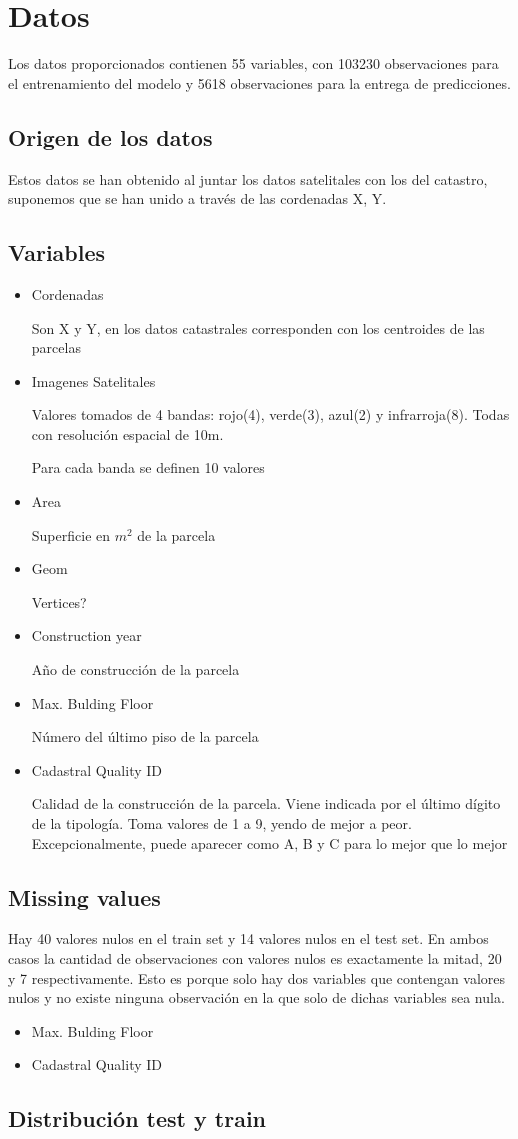 \section{Datos}
Los datos proporcionados contienen 55 variables, con 103230 observaciones para el entrenamiento del modelo y 5618 observaciones para la entrega de predicciones.
\par
\subsection{Origen de los datos}
Estos datos se han obtenido al juntar los datos satelitales con los del catastro, suponemos que se han unido a través de las cordenadas X, Y.
\subsection{Variables}
\begin{itemize}
\item Cordenadas
\par
Son X y Y, en los datos catastrales corresponden con los centroides de las parcelas\cite{catastro}
\item Imagenes Satelitales
\par
Valores tomados de 4 bandas: rojo(4), verde(3), azul(2) y infrarroja(8). Todas con resolución espacial de 10m.
\par
Para cada banda se definen 10 valores
\item Area
\par
Superficie en $m^{2}$ de la parcela
\item Geom
\par
Vertices?
\item Construction year
\par
Año de construcción de la parcela
\item Max. Bulding Floor
\par
Número del último piso de la parcela
\item Cadastral Quality ID
\par
Calidad de la construcción de la parcela. 
Viene indicada por el último dígito de la tipología. 
Toma valores de 1 a 9, yendo de mejor a peor. Excepcionalmente, puede aparecer como A, B y C para lo mejor que lo mejor\cite{catastro}



\end{itemize}
\subsection{Missing values}
Hay 40 valores nulos en el train set y 14 valores nulos en el test set.
En ambos casos la cantidad de observaciones con valores nulos es exactamente la mitad, 20 y 7 respectivamente.
Esto es porque solo hay dos variables que contengan valores nulos y no existe ninguna observación en la que solo de dichas variables sea nula.
\begin{itemize}
    \item Max. Bulding Floor
    \item Cadastral Quality ID
\end{itemize}




\subsection{Distribución test y train}